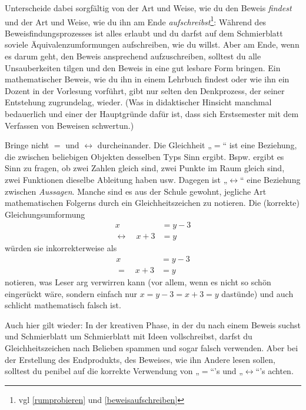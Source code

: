 \begin{bem}[„Gleichungs-U's“]
\begin{bew}
    \end{bew}
    Unterscheide dabei sorgfältig von der Art und Weise, wie du den Beweis \emph{findest} und der Art und Weise, wie du ihn am Ende \emph{aufschreibst}\footnote{vgl \cref{rumprobieren} und \cref{beweisaufschreiben}}: Während des Beweisfindungsprozesses ist alles erlaubt und du darfst auf dem Schmierblatt soviele Äquivalenzumformungen aufschreiben, wie du willst. Aber am Ende, wenn es darum geht, den Beweis ansprechend aufzuschreiben, solltest du alle Unsauberkeiten tilgen und den Beweis in eine gut lesbare Form bringen. Ein mathematischer Beweis, wie du ihn in einem Lehrbuch findest oder wie ihn ein Dozent in der Vorlesung vorführt, gibt nur selten den Denkprozess, der seiner Entstehung zugrundelag, wieder. (Was in didaktischer Hinsicht manchmal bedauerlich und einer der Hauptgründe dafür ist, dass sich Erstsemester mit dem Verfassen von Beweisen schwertun.)
\end{bem}


\begin{bem}[Unterschied zwischen $=$ und $\leftrightarrow$]
    Bringe nicht $=$ und $\leftrightarrow$ durcheinander. Die Gleichheit „$=$“ ist eine Beziehung, die zwischen beliebigen Objekten desselben Typs Sinn ergibt. Bspw. ergibt es Sinn zu fragen, ob zwei Zahlen gleich sind, zwei Punkte im Raum gleich sind, zwei Funktionen dieselbe Ableitung haben usw. Dagegen ist „$\leftrightarrow$“ eine Beziehung zwischen \emph{Aussagen}. Manche sind es aus der Schule gewohnt, jegliche Art mathematischen Folgerns durch ein Gleichheitszeichen zu notieren. Die (korrekte) Gleichungsumformung
    \begin{align*}
        x & = y-3 \\
        \leftrightarrow\quad  x+3 & = y
    \end{align*}
    würden sie inkorrekterweise als
    \begin{align*}
        x & = y-3 \\
        = \quad x+3 & = y
    \end{align*}
    notieren, was Leser arg verwirren kann (vor allem, wenn es nicht so schön eingerückt wäre, sondern einfach nur $x=y-3=x+3=y$ dastünde) und auch schlicht mathematisch falsch ist.
    
    Auch hier gilt wieder: In der kreativen Phase, in der du nach einem Beweis suchst und Schmierblatt um Schmierblatt mit Ideen vollschreibst, darfst du Gleichheitszeichen nach Belieben spammen und sogar falsch verwenden. Aber bei der Erstellung des Endprodukts, des Beweises, wie ihn Andere lesen sollen, solltest du penibel auf die korrekte Verwendung von „$=$“'s und „$\leftrightarrow$“'s achten.
\end{bem}


